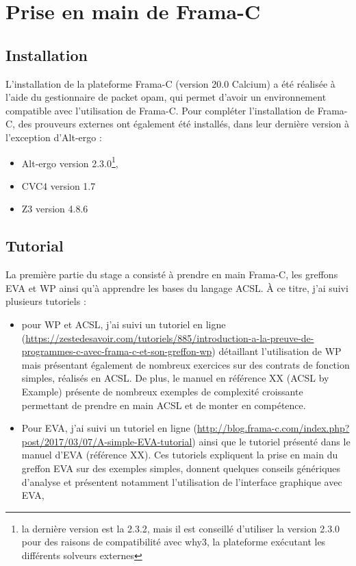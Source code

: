 


\section{Prise en main de Frama-C}

\subsection{Installation}

L'installation de la plateforme Frama-C (version 20.0 Calcium) a été réalisée à l'aide du gestionnaire de packet opam, qui permet d'avoir un environnement compatible avec l'utilisation de Frama-C. Pour compléter l'installation de Frama-C, des prouveurs externes ont également été installés, dans leur dernière version à l'exception d'Alt-ergo :
\begin{itemize}
	\item Alt-ergo version 2.3.0\footnote{la dernière version est la 2.3.2, mais il est conseillé d'utiliser la version 2.3.0 pour des raisons de compatibilité avec why3, la plateforme exécutant les différents solveurs externes},
	\item CVC4 version 1.7
	\item Z3 version 4.8.6
\end{itemize}

\subsection{Tutorial}

La première partie du stage a consisté à prendre en main Frama-C, les greffons EVA et WP ainsi qu'à apprendre les bases du langage ACSL. À ce titre, j'ai suivi plusieurs tutoriels :
\begin{itemize}
	\item pour WP et ACSL, j'ai suivi un tutoriel en ligne (\url{https://zestedesavoir.com/tutoriels/885/introduction-a-la-preuve-de-programmes-c-avec-frama-c-et-son-greffon-wp}) détaillant l'utilisation de WP mais présentant également de nombreux exercices sur des contrats de fonction simples, réalisés en ACSL. De plus, le manuel en référence XX (ACSL by Example) présente de nombreux exemples de complexité croissante permettant de prendre en main ACSL et de monter en compétence.
	\item Pour EVA, j'ai suivi un tutoriel en ligne (\url{http://blog.frama-c.com/index.php?post/2017/03/07/A-simple-EVA-tutorial}) ainsi que le tutoriel présenté dans le manuel d'EVA (référence XX). Ces tutoriels expliquent la prise en main du greffon EVA sur des exemples simples, donnent quelques conseils génériques d'analyse et présentent notamment l'utilisation de l'interface graphique avec EVA,
\end{itemize}

